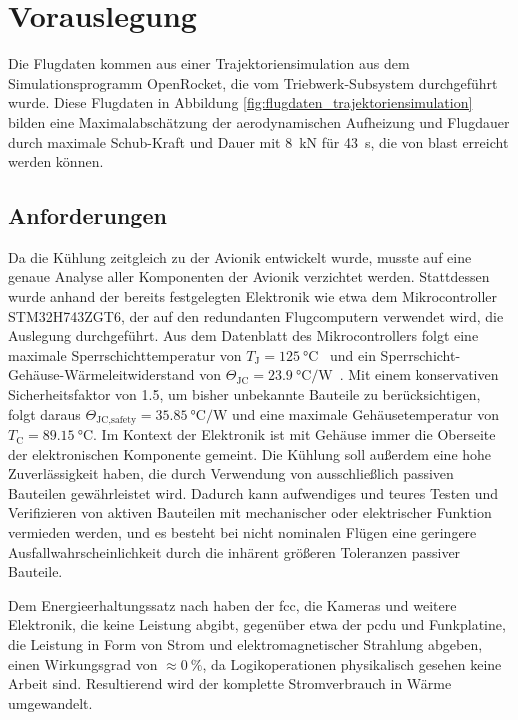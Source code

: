 \chapter{Vorauslegung}
\label{chap:Vorauslegung}



Die Flugdaten kommen aus einer Trajektoriensimulation aus dem Simulationsprogramm OpenRocket, die vom Triebwerk-Subsystem durchgeführt wurde.
Diese Flugdaten in Abbildung \ref{fig:flugdaten_trajektoriensimulation} bilden eine Maximalabschätzung der aerodynamischen Aufheizung und Flugdauer durch
maximale Schub-Kraft und Dauer mit \SI{8}{\kilo\newton} für \SI{43}{\second}, die von \ac{blast} erreicht werden können.

\section{Anforderungen}

Da die Kühlung zeitgleich zu der Avionik entwickelt wurde, musste auf eine genaue Analyse aller Komponenten der Avionik verzichtet werden.
Stattdessen wurde anhand der bereits festgelegten Elektronik wie etwa dem Mikrocontroller STM32H743ZGT6, der auf den redundanten Flugcomputern verwendet wird,
die Auslegung durchgeführt.
Aus dem Datenblatt des Mikrocontrollers folgt eine maximale Sperrschichttemperatur von $T_\text{J} = \SI{125}{\degreeCelsius}$~\cite{STM32}
und ein Sperrschicht-Gehäuse-Wärmeleitwiderstand von $\Theta_\text{JC} = \SI{23,9}{\degreeCelsius\per\watt}$~\cite{STM32}. Mit einem konservativen
Sicherheitsfaktor von 1.5, um bisher unbekannte Bauteile zu berücksichtigen, folgt daraus $\Theta_\text{JC,safety} = \SI{35,85}{\degreeCelsius\per\watt}$
und eine maximale Gehäusetemperatur von $T_\text{C} = \SI{89,15}{\degreeCelsius}$. Im Kontext der Elektronik ist mit Gehäuse immer die
Oberseite der elektronischen Komponente gemeint.
Die Kühlung soll außerdem eine hohe Zuverlässigkeit haben, die durch Verwendung von ausschließlich passiven Bauteilen gewährleistet wird.
Dadurch kann aufwendiges und teures Testen und Verifizieren von aktiven Bauteilen mit mechanischer oder elektrischer Funktion vermieden werden, und es besteht bei
nicht nominalen Flügen eine geringere Ausfallwahrscheinlichkeit durch die inhärent größeren Toleranzen passiver Bauteile.

Dem Energieerhaltungssatz nach haben der \ac{fcc}, die Kameras und weitere Elektronik, die keine Leistung abgibt, gegenüber etwa
der \ac{pcdu} und Funkplatine, die Leistung in Form von Strom und elektromagnetischer Strahlung abgeben, einen Wirkungsgrad von
$\approx\SI{0}{\percent}$, da Logikoperationen physikalisch gesehen keine Arbeit sind. Resultierend wird der komplette Stromverbrauch
in Wärme umgewandelt.

